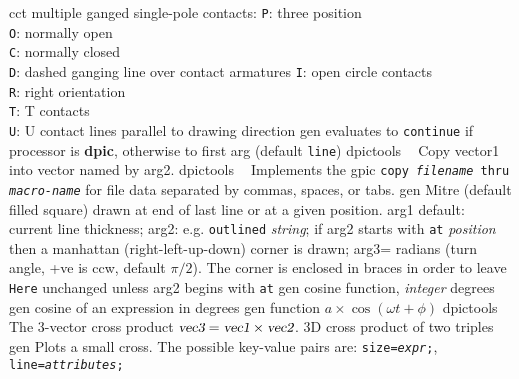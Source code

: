 %
  {cct}%
  {multiple ganged single-pole contacts:
   {\tt P}: three position\\
   {\tt O}: normally open\\
   {\tt C}: normally closed\\
   {\tt D}: dashed ganging line over contact armatures
   {\tt I}: open circle contacts\\
   {\tt R}: right orientation\\
   {\tt T}: T contacts\\
   {\tt U}: U contact lines parallel to drawing direction
   }%
%
  {gen}%
  {evaluates to {\tt continue}%
    if processor is {\bf dpic}, otherwise to first arg (default {\tt line})}%
%
  {dpictools}%
  {$\;\;$ Copy vector1 into vector named by arg2.}%
%
  {dpictools}%
  {$\;\;$ Implements the gpic {\tt copy {\sl filename} thru {\sl macro-name}}%
   for file data separated by commas, spaces, or tabs.}%
%
  {gen}%
  { Mitre (default filled square) drawn at end of last line or at a
    given position.
    arg1 default: current line thickness;
    arg2: e.g. {\tt outlined} {\sl string}; if arg2 starts with
    {\tt at} {\sl position} then a manhattan (right-left-up-down) corner
    is drawn;
    arg3= radians (turn angle, +ve is ccw, default $\pi/2$).
    The corner is enclosed in braces
    in order to leave {\tt Here} unchanged unless arg2 begins with {\tt at}%
    }%
%
  {gen}%
  {cosine function, {\sl integer\/} degrees}%
%
  {gen}%
  {cosine of an expression in degrees}%
%
  {gen}%
  {function $a\times\cos(\omega t + \phi)$ }%
%
  {dpictools}%
  {$\;\;$ The 3-vector cross product
    $\hbox{\sl vec3} = \hbox{\sl vec1} \times \hbox{\sl vec2}$.}%
%
  {3D}%
  {cross product of two triples}%
%
  {gen}%
  {Plots a small cross.  The possible key-value pairs are:
    {\tt size={\sl expr};},
    {\tt line={\sl attributes};} }%
%

